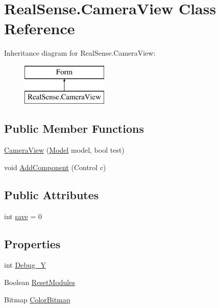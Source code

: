 \hypertarget{class_real_sense_1_1_camera_view}{}\section{Real\+Sense.\+Camera\+View Class Reference}
\label{class_real_sense_1_1_camera_view}
Inheritance diagram for Real\+Sense.\+Camera\+View\+:\begin{figure}[H]
\begin{center}
\leavevmode
\includegraphics[height=2.000000cm]{class_real_sense_1_1_camera_view}
\end{center}
\end{figure}
\subsection*{Public Member Functions}
\begin{DoxyCompactItemize}
\item 
\hyperlink{class_real_sense_1_1_camera_view_ac30953a5ea5feba14c2243833e2e5908}{Camera\+View} (\hyperlink{class_real_sense_1_1_model}{Model} model, bool test)
\item 
void \hyperlink{class_real_sense_1_1_camera_view_a67c8ee2cdbf0caf43e48043d90c0d549}{Add\+Component} (Control c)
\end{DoxyCompactItemize}
\subsection*{Public Attributes}
\begin{DoxyCompactItemize}
\item 
int \hyperlink{class_real_sense_1_1_camera_view_a78ec68053fa36d321ce259f1d23e1d51}{save} = 0
\end{DoxyCompactItemize}
\subsection*{Properties}
\begin{DoxyCompactItemize}
\item 
int \hyperlink{class_real_sense_1_1_camera_view_a5cc5cea08df7b36da52efba2a166e361}{Debug\+\_\+Y}
\item 
Boolean \hyperlink{class_real_sense_1_1_camera_view_a342611e6157bb18b9c097186b3b9bee0}{Reset\+Modules}
\item 
Bitmap \hyperlink{class_real_sense_1_1_camera_view_a487ce7be920e8f6742d704d97a6057dc}{Color\+Bitmap}
\end{DoxyCompactItemize}


